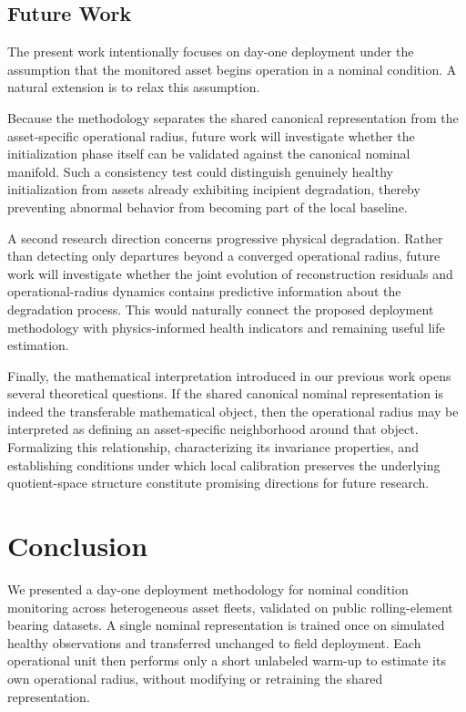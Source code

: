 \documentclass[11pt,a4paper]{article}
\begin{document}
\subsection{Future Work}

The present work intentionally focuses on day-one deployment under the assumption that the
monitored asset begins operation in a nominal condition. A natural extension is to relax this
assumption.

Because the methodology separates the shared canonical representation from the asset-specific
operational radius, future work will investigate whether the initialization phase itself can be
validated against the canonical nominal manifold. Such a consistency test could distinguish
genuinely healthy initialization from assets already exhibiting incipient degradation, thereby
preventing abnormal behavior from becoming part of the local baseline.

A second research direction concerns progressive physical degradation. Rather than detecting only
departures beyond a converged operational radius, future work will investigate whether the joint
evolution of reconstruction residuals and operational-radius dynamics contains predictive
information about the degradation process. This would naturally connect the proposed deployment
methodology with physics-informed health indicators and remaining useful life estimation.

Finally, the mathematical interpretation introduced in our previous work
\cite{disanti2026quotient} opens several theoretical questions. If the shared canonical nominal
representation is indeed the transferable mathematical object, then the operational radius may be
interpreted as defining an asset-specific neighborhood around that object. Formalizing this
relationship, characterizing its invariance properties, and establishing conditions under which
local calibration preserves the underlying quotient-space structure constitute promising
directions for future research.

\section{Conclusion}

We presented a day-one deployment methodology for nominal condition monitoring across
heterogeneous asset fleets, validated on public rolling-element bearing datasets. A single
nominal representation is trained once on simulated healthy observations and transferred
unchanged to field deployment. Each operational unit then performs only a short unlabeled
warm-up to estimate its own operational radius, without modifying or retraining the shared
representation.
\end{document}
